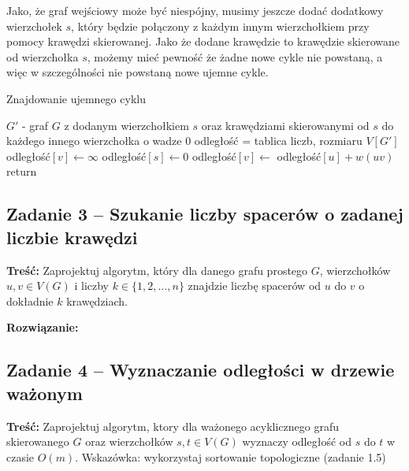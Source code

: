 Jako, że graf wejściowy może być niespójny,
musimy jeszcze dodać dodatkowy wierzchołek $s$, który
będzie połączony z każdym innym wierzchołkiem
przy pomocy krawędzi skierowanej. Jako
że dodane krawędzie to krawędzie skierowane
od wierzchołka $s$, możemy mieć pewność
że żadne nowe cykle nie powstaną, a więc
w szczególności nie powstaną nowe
ujemne cykle.

\begin{algorithm}[H]
	\caption{Znajdowanie ujemnego cyklu}
	\begin{algorithmic}[1]
		\State $G'$ - graf $G$ z dodanym wierzchołkiem $s$
		oraz krawędziami skierowanymi od $s$ do każdego innego
		wierzchołka o wadze $0$
		\State odległość = tablica liczb, rozmiaru $V[G']$
		\State odległość$[v]\gets\infty$
		\EndFor
		\State odległość$[s]\gets0$
		\State odległość$[v]\gets$ odległość$[u] + w(uv)$ 
		\EndIf
		\EndFor
		\EndFor
		\State return \true
		\EndIf
		\EndFor
		\State \Return \false
		\EndProcedure
	\end{algorithmic}
	\label{Zadanie32}
\end{algorithm}

\subsection{Zadanie 3 -- Szukanie liczby spacerów o zadanej liczbie krawędzi}
\textbf{Treść: }
Zaprojektuj algorytm, który dla danego grafu prostego 
$G$, wierzchołków $u, v \in V(G)$ i liczby $k \in
\{1, 2, \ldots , n\}$ znajdzie liczbę spacerów 
od $u$ do $v$ o dokładnie $k$ krawędziach.

\textbf{Rozwiązanie: } %

\subsection{Zadanie 4 -- Wyznaczanie odległości w drzewie ważonym}
\textbf{Treść: } Zaprojektuj algorytm, ktory dla ważonego 
acyklicznego grafu skierowanego $G$ oraz wierzchołków $s, t \in
V(G)$ wyznaczy odległość od $s$ do $t$ w czasie $O(m)$. 
Wskazówka: wykorzystaj sortowanie topologiczne (zadanie 1.5)

